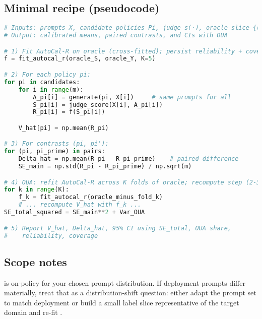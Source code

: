 \subsection{Minimal recipe (pseudocode)}

\begin{lstlisting}[language=Python,caption=DM Recipe]
# Inputs: prompts X, candidate policies Pi, judge s(·), oracle slice {(S, Y)}
# Output: calibrated means, paired contrasts, and CIs with OUA

# 1) Fit AutoCal-R on oracle (cross-fitted); persist reliability + coverage edges
f = fit_autocal_r(oracle_S, oracle_Y, K=5)

# 2) For each policy pi:
for pi in candidates:
    for i in range(m):
        A_pi[i] = generate(pi, X[i])     # same prompts for all
        S_pi[i] = judge_score(X[i], A_pi[i])
        R_pi[i] = f(S_pi[i])

    V_hat[pi] = np.mean(R_pi)

# 3) For contrasts (pi, pi'):
for (pi, pi_prime) in pairs:
    Delta_hat = np.mean(R_pi - R_pi_prime)    # paired difference
    SE_main = np.std(R_pi - R_pi_prime) / np.sqrt(m)

# 4) OUA: refit AutoCal-R across K folds of oracle; recompute step (2-3)
for k in range(K):
    f_k = fit_autocal_r(oracle_minus_fold_k)
    # ... recompute V_hat with f_k ...
SE_total_squared = SE_main**2 + Var_OUA

# 5) Report V_hat, Delta_hat, 95% CI using SE_total, OUA share,
#    reliability, coverage
\end{lstlisting}

\subsection{Scope notes}

\dm{} is on-policy for your chosen prompt distribution. If deployment prompts differ materially, treat that as a distribution-shift question: either adapt the prompt set to match deployment or build a small label slice representative of the target domain and re-fit \autocal.
